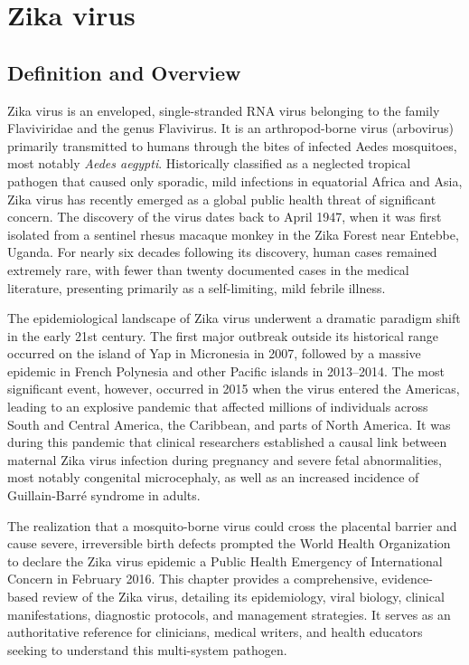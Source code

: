 \chapter{Zika virus}

\section*{Definition and Overview}
Zika virus is an enveloped, single-stranded RNA virus belonging to the family Flaviviridae and the genus Flavivirus. It is an arthropod-borne virus (arbovirus) primarily transmitted to humans through the bites of infected Aedes mosquitoes, most notably \textit{Aedes aegypti}. Historically classified as a neglected tropical pathogen that caused only sporadic, mild infections in equatorial Africa and Asia, Zika virus has recently emerged as a global public health threat of significant concern. The discovery of the virus dates back to April 1947, when it was first isolated from a sentinel rhesus macaque monkey in the Zika Forest near Entebbe, Uganda. For nearly six decades following its discovery, human cases remained extremely rare, with fewer than twenty documented cases in the medical literature, presenting primarily as a self-limiting, mild febrile illness.

The epidemiological landscape of Zika virus underwent a dramatic paradigm shift in the early 21st century. The first major outbreak outside its historical range occurred on the island of Yap in Micronesia in 2007, followed by a massive epidemic in French Polynesia and other Pacific islands in 2013--2014. The most significant event, however, occurred in 2015 when the virus entered the Americas, leading to an explosive pandemic that affected millions of individuals across South and Central America, the Caribbean, and parts of North America. It was during this pandemic that clinical researchers established a causal link between maternal Zika virus infection during pregnancy and severe fetal abnormalities, most notably congenital microcephaly, as well as an increased incidence of Guillain-Barr\'e syndrome in adults.

The realization that a mosquito-borne virus could cross the placental barrier and cause severe, irreversible birth defects prompted the World Health Organization to declare the Zika virus epidemic a Public Health Emergency of International Concern in February 2016. This chapter provides a comprehensive, evidence-based review of the Zika virus, detailing its epidemiology, viral biology, clinical manifestations, diagnostic protocols, and management strategies. It serves as an authoritative reference for clinicians, medical writers, and health educators seeking to understand this multi-system pathogen.

